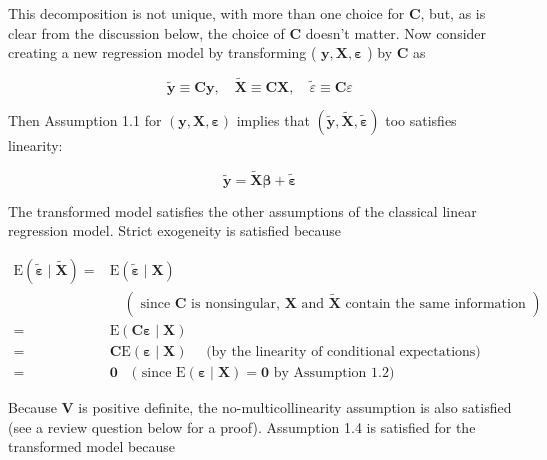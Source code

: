 \documentclass[10pt]{article}
\begin{document}
This decomposition is not unique, with more than one choice for $\mathbf{C}$, but, as is clear from the discussion below, the choice of $\mathbf{C}$ doesn't matter. Now consider creating a new regression model by transforming ( $\mathbf{y}, \mathbf{X}, \boldsymbol{\varepsilon}$ ) by $\mathbf{C}$ as


\begin{equation*}
\tilde{\mathbf{y}} \equiv \mathbf{C} \mathbf{y}, \quad \tilde{\mathbf{X}} \equiv \mathbf{C X}, \quad \tilde{\varepsilon} \equiv \mathbf{C} \varepsilon \tag{1.6.3}
\end{equation*}


Then Assumption 1.1 for $(\mathbf{y}, \mathbf{X}, \boldsymbol{\varepsilon})$ implies that $(\tilde{\mathbf{y}}, \tilde{\mathbf{X}}, \tilde{\boldsymbol{\varepsilon}})$ too satisfies linearity:


\begin{equation*}
\tilde{\mathbf{y}}=\widetilde{\mathbf{X}} \boldsymbol{\beta}+\tilde{\boldsymbol{\varepsilon}} \tag{1.6.4}
\end{equation*}


The transformed model satisfies the other assumptions of the classical linear regression model. Strict exogeneity is satisfied because

$$
\begin{aligned}
\mathrm{E}(\tilde{\boldsymbol{\varepsilon}} \mid \widetilde{\mathbf{X}})= & \mathrm{E}(\tilde{\boldsymbol{\varepsilon}} \mid \mathbf{X}) \\
& \quad(\text { since } \mathbf{C} \text { is nonsingular, } \mathbf{X} \text { and } \tilde{\mathbf{X}} \text { contain the same information }) \\
= & \mathrm{E}(\mathbf{C} \boldsymbol{\varepsilon} \mid \mathbf{X}) \\
= & \mathbf{C} \mathrm{E}(\boldsymbol{\varepsilon} \mid \mathbf{X}) \quad \text { (by the linearity of conditional expectations) } \\
= & \mathbf{0} \quad(\text { since } \mathrm{E}(\boldsymbol{\varepsilon} \mid \mathbf{X})=\mathbf{0} \text { by Assumption 1.2) }
\end{aligned}
$$

Because $\mathbf{V}$ is positive definite, the no-multicollinearity assumption is also satisfied (see a review question below for a proof). Assumption 1.4 is satisfied for the transformed model because
\end{document}
